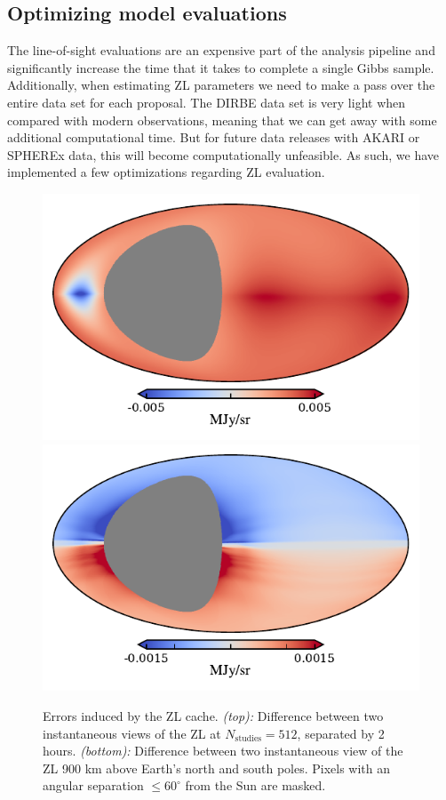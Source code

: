 \documentclass[twocolumn]{aa}
\begin{document}
\subsection{Optimizing model evaluations}\label{sect:optimization}
The line-of-sight evaluations are an expensive part of the analysis 
pipeline and significantly increase the time that it takes to complete a 
single Gibbs sample. Additionally, when estimating ZL parameters we need 
to make a pass over the entire data set for each proposal. The DIRBE 
data set is very light when compared with modern observations, meaning 
that we can get away with some additional computational time. But for 
future data releases with AKARI or SPHEREx data, this will become 
computationally unfeasible. As such, we have implemented a few 
optimizations regarding ZL evaluation. 
\begin{figure}
    \includegraphics[width=\columnwidth]{figs/cache_error_delta_t.pdf}
    \includegraphics[width=\columnwidth]{figs/cache_error_z.pdf}
    \caption{Errors induced by the ZL cache. \textit{(top):} Difference 
    between two instantaneous views of the ZL at $N_\mathrm{studies}=512$, 
    separated by 2 hours. \textit{(bottom):} Difference between two 
    instantaneous view of the ZL 900 km above Earth's north and south 
    poles. Pixels with an angular separation $\leq 60^\circ$ from the Sun 
    are masked.}
    \label{fig:cache-error}
\end{figure}
\end{document}
